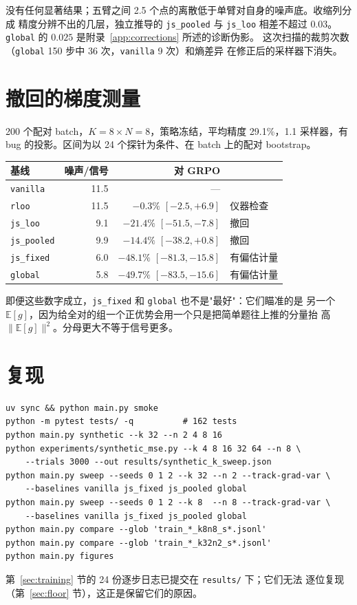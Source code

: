 \documentclass{article}
\newcommand{\E}{\mathbb{E}}
\newcommand{\arm}[1]{\texttt{#1}}
\begin{document}
没有任何显著结果；五臂之间 2.5 个点的离散低于单臂对自身的噪声底。收缩列分成
精度分辨不出的几层，独立推导的 \arm{js\_pooled} 与 \arm{js\_loo} 相差不超过
$0.03$。\arm{global} 的 $0.025$ 是附录~\ref{app:corrections} 所述的诊断伪影。
这次扫描的裁剪次数（\arm{global} 150 步中 36 次，\arm{vanilla} 9 次）和熵差异
在修正后的采样器下消失。

\section{撤回的梯度测量}
\label{app:gradvar}

200 个配对 batch，$K=8\times N=8$，策略冻结，平均精度 29.1\%，1.1 采样器，有
bug 的投影。区间为以 24 个探针为条件、在 batch 上的配对 bootstrap。

\begin{center}\small
\begin{tabular}{lrrl}
\toprule
基线 & 噪声/信号 & 对 GRPO & \\
\midrule
\arm{vanilla}    & 11.5 & ---                      & \\
\arm{rloo}       & 11.5 & $-0.3\%$ $[-2.5,+6.9]$   & 仪器检查 \\
\arm{js\_loo}    & 9.1  & $-21.4\%$ $[-51.5,-7.8]$ & 撤回 \\
\arm{js\_pooled} & 9.9  & $-14.4\%$ $[-38.2,+0.8]$ & 撤回 \\
\arm{js\_fixed}  & 6.0  & $-48.1\%$ $[-81.3,-15.8]$& 有偏估计量 \\
\arm{global}     & 5.8  & $-49.7\%$ $[-83.5,-15.6]$& 有偏估计量 \\
\bottomrule
\end{tabular}
\end{center}

即便这些数字成立，\arm{js\_fixed} 和 \arm{global} 也不是"最好"：它们瞄准的是
另一个 $\E[g]$，因为给全对的组一个正优势会用一个只是把简单题往上推的分量抬
高 $\lVert\E[g]\rVert^2$。分母更大不等于信号更多。

\section{复现}

\begin{verbatim}
uv sync && python main.py smoke
python -m pytest tests/ -q          # 162 tests
python main.py synthetic --k 32 --n 2 4 8 16
python experiments/synthetic_mse.py --k 4 8 16 32 64 --n 8 \
    --trials 3000 --out results/synthetic_k_sweep.json
python main.py sweep --seeds 0 1 2 --k 32 --n 2 --track-grad-var \
    --baselines vanilla js_fixed js_pooled global
python main.py sweep --seeds 0 1 2 --k 8  --n 8 --track-grad-var \
    --baselines vanilla js_fixed js_pooled global
python main.py compare --glob 'train_*_k8n8_s*.jsonl'
python main.py compare --glob 'train_*_k32n2_s*.jsonl'
python main.py figures
\end{verbatim}

第~\ref{sec:training} 节的 24 份逐步日志已提交在 \texttt{results/} 下；它们无法
逐位复现（第~\ref{sec:floor} 节），这正是保留它们的原因。
\end{document}

